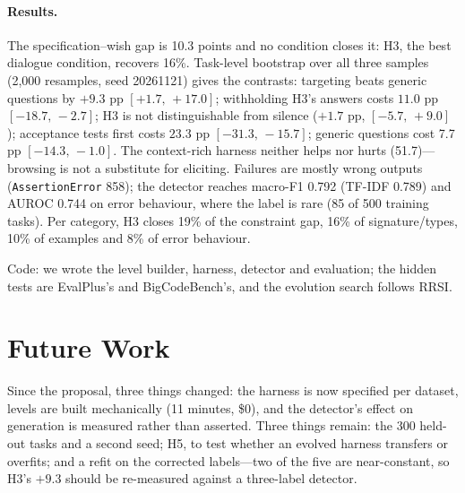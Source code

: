 \documentclass{article}
\begin{document}
\paragraph{Results.}
The specification--wish gap is 10.3 points and no condition closes it: H3, the best dialogue
condition, recovers 16\%. Task-level bootstrap over all three samples (2{,}000 resamples, seed
20261121) gives the contrasts: targeting beats generic questions by $+9.3$ pp $[+1.7,\,+17.0]$;
withholding H3's answers costs $11.0$ pp $[-18.7,\,-2.7]$; H3 is not distinguishable from silence
($+1.7$ pp, $[-5.7,\,+9.0]$); acceptance tests first costs $23.3$ pp $[-31.3,\,-15.7]$; generic
questions cost 7.7 pp $[-14.3,\,-1.0]$. The context-rich harness neither helps nor
hurts (51.7)---browsing is not a substitute for eliciting. Failures are mostly wrong outputs
(\texttt{AssertionError} 858); the detector reaches macro-F1 0.792 (TF-IDF 0.789) and AUROC 0.744
on error behaviour, where the label is rare (85 of 500 training tasks). Per category, H3 closes 19\% of the constraint gap, 16\% of signature/types,
10\% of examples and 8\% of error behaviour.

Code: we wrote the level builder, harness, detector and evaluation; the hidden tests are EvalPlus's and BigCodeBench's, and the evolution search follows RRSI.

\section{Future Work}

Since the proposal, three things changed: the harness is now specified per dataset, levels are
built mechanically (11 minutes, \$0), and the detector's effect on generation is measured rather
than asserted. Three things remain: the 300 held-out tasks and a second seed; H5, to test whether
an evolved harness transfers or overfits; and a refit on the corrected labels---two of the five
are near-constant, so H3's $+9.3$ should be re-measured against a three-label detector.



\end{document}
